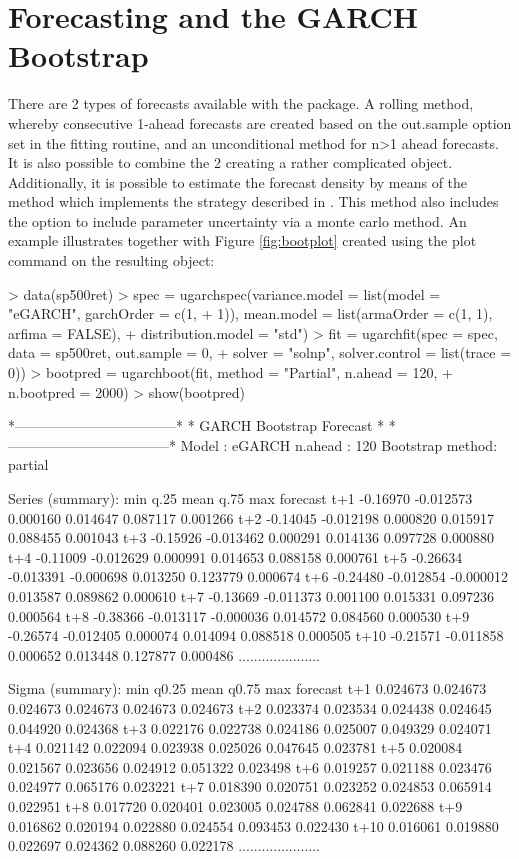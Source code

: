 \section{Forecasting and the GARCH Bootstrap}\label{section:forecasting}
There are 2 types of forecasts available with the package. A rolling method,
whereby consecutive 1-ahead forecasts are created based on the out.sample option
set in the fitting routine, and an unconditional method for n>1 ahead forecasts.
It is also possible to combine the 2 creating a rather complicated object.
Additionally, it is possible to estimate the forecast density by means of the
\verb@ugarchboot@ method which implements the strategy described in
\citet{Pascual2}. This method also includes the option to include parameter
uncertainty via a monte carlo method. An example illustrates together with
Figure \ref{fig:bootplot} created using the plot command on the resulting
\verb@uGARCHboot@ object:
\begin{Schunk}
\begin{Sinput}
> data(sp500ret)
> spec = ugarchspec(variance.model = list(model = "eGARCH", garchOrder = c(1,
+     1)), mean.model = list(armaOrder = c(1, 1), arfima = FALSE),
+     distribution.model = "std")
> fit = ugarchfit(spec = spec, data = sp500ret, out.sample = 0,
+     solver = "solnp", solver.control = list(trace = 0))
> bootpred = ugarchboot(fit, method = "Partial", n.ahead = 120,
+     n.bootpred = 2000)
> show(bootpred)
\end{Sinput}
\begin{Soutput}
*-----------------------------------*
*     GARCH Bootstrap Forecast      *
*-----------------------------------*
Model : eGARCH
n.ahead : 120
Bootstrap method:  partial

Series (summary):
          min      q.25      mean     q.75      max forecast
t+1  -0.16970 -0.012573  0.000160 0.014647 0.087117 0.001266
t+2  -0.14045 -0.012198  0.000820 0.015917 0.088455 0.001043
t+3  -0.15926 -0.013462  0.000291 0.014136 0.097728 0.000880
t+4  -0.11009 -0.012629  0.000991 0.014653 0.088158 0.000761
t+5  -0.26634 -0.013391 -0.000698 0.013250 0.123779 0.000674
t+6  -0.24480 -0.012854 -0.000012 0.013587 0.089862 0.000610
t+7  -0.13669 -0.011373  0.001100 0.015331 0.097236 0.000564
t+8  -0.38366 -0.013117 -0.000036 0.014572 0.084560 0.000530
t+9  -0.26574 -0.012405  0.000074 0.014094 0.088518 0.000505
t+10 -0.21571 -0.011858  0.000652 0.013448 0.127877 0.000486
.....................

Sigma (summary):
          min    q0.25     mean    q0.75      max forecast
t+1  0.024673 0.024673 0.024673 0.024673 0.024673 0.024673
t+2  0.023374 0.023534 0.024438 0.024645 0.044920 0.024368
t+3  0.022176 0.022738 0.024186 0.025007 0.049329 0.024071
t+4  0.021142 0.022094 0.023938 0.025026 0.047645 0.023781
t+5  0.020084 0.021567 0.023656 0.024912 0.051322 0.023498
t+6  0.019257 0.021188 0.023476 0.024977 0.065176 0.023221
t+7  0.018390 0.020751 0.023252 0.024853 0.065914 0.022951
t+8  0.017720 0.020401 0.023005 0.024788 0.062841 0.022688
t+9  0.016862 0.020194 0.022880 0.024554 0.093453 0.022430
t+10 0.016061 0.019880 0.022697 0.024362 0.088260 0.022178
.....................
\end{Soutput}
\end{Schunk}
